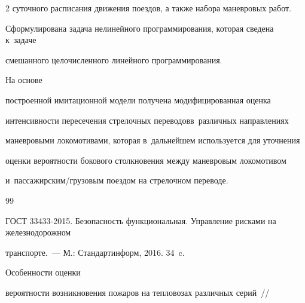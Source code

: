 \begin{multicols}{2}
суточного расписания движения поездов, а также набора маневровых работ. 







Сформулирована задача нелинейного программирования, которая сведена к~задаче 


смешанного целочисленного линейного программирования. 







На основе 


построенной имитационной модели получена модифицированная оценка 


интен\-сивности пересечения стрелочных переводов\linebreak в~различных направлениях 


маневровыми локомотивами, которая в~дальнейшем используется для уточнения 


оценки вероятности бокового столкновения между маневровым локомотивом 


и~пассажирским/грузовым поездом на стрелочном пере\-воде.





\vspace*{-8pt}


      


{\small\frenchspacing


 {%




 \begin{thebibliography}{99}


\vspace*{-2pt}







ГОСТ 33433-2015. Безопасность функциональная. Управление рисками на железнодорожном 


транспорте.~--- М.: Стандартинформ, 2016. 34~c.







 Особенности оценки 


вероятности возникновения пожаров на тепловозах различных серий~// 



\end{thebibliography}}}
\end{multicols}
